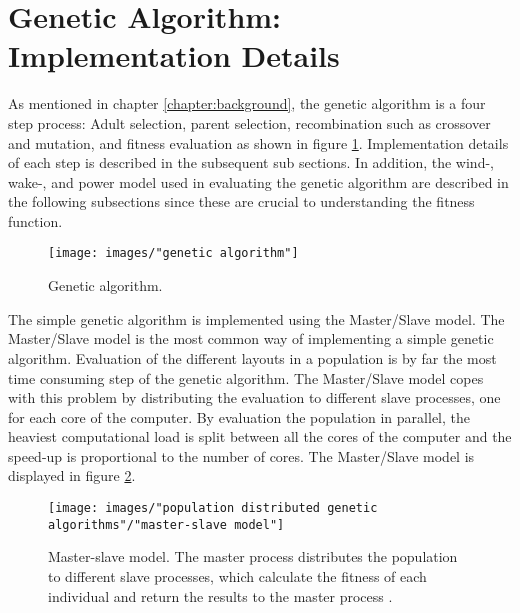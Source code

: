 \section{Genetic Algorithm: Implementation Details}\label{section:genetic algorithm}
As mentioned in chapter \ref{chapter:background}, the genetic algorithm is a four step process: Adult selection, parent selection, recombination such as crossover and mutation, and fitness evaluation as shown in figure \ref{figure:genetic algorithm steps}. Implementation details of each step is described in the subsequent sub sections. In addition, the wind-, wake-, and power model used in evaluating the genetic algorithm are described in the following subsections since these are crucial to understanding the fitness function. 


\begin{figure}[h!]
\begin{center}
\texttt{[image: images/"genetic algorithm"]}
\caption{Genetic algorithm.}
\label{figure:genetic algorithm steps}
\end{center}
\end{figure}


\noindent The simple genetic algorithm is implemented using the Master/Slave model. The Master/Slave model is the most common way of implementing a simple genetic algorithm. Evaluation of the different layouts in a population is by far the most time consuming step of the genetic algorithm. The Master/Slave model copes with this problem by distributing the evaluation to different slave processes, one for each core of the computer. By evaluation the population in parallel, the heaviest computational load is split between all the cores of the computer and the speed-up is proportional to the number of cores. The Master/Slave model is displayed in figure \ref{Master-Slave Model}.\\


\begin{figure}[h!]
\begin{center}
\texttt{[image: images/"population distributed genetic algorithms"/"master-slave model"]}
\caption{Master-slave model. The master process distributes the population to different slave processes, which calculate the fitness of each individual and return the results to the master process \citep{Gong}.}
\label{Master-Slave Model}
\end{center}
\end{figure}


